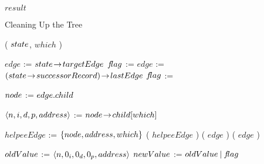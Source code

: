 \begin{limitscope}
\begin{algorithm}[!thb]
{{			
			
	 }
	
	  \BlankLine
		\Return $result$\;
		



}

\caption{Cleaning Up the Tree}
\label{algo:cleanup}
\end{algorithm}





\begin{algorithm}[!thb]
\DefineKeyWords
\DontPrintSemicolon
\Boolean \MarkChildEdge( $state$, $which$ )\;
\PrintSemicolon
\Begin
{

	 {
	    $edge$ := $state \!\rightarrow\! targetEdge$\; 
	    $\flag$ := \DELETEFLAG\;
	 }
	 \Else
	 {
	    $edge$ := $( state \!\rightarrow\! successorRecord ) \!\rightarrow\! lastEdge$\; 
	    $\flag$ := \PROMOTEFLAG\;
	 }
	 
	 
   $node$ := $edge.child$\;
	
   \BlankLine
  
	 \While{\True}
	 {
	    $\langle n, i, d, p, address \rangle$ := $node \!\rightarrow\! child[which]$\;
			
			\uIf{$\iFlag$}
			{
			   $helpeeEdge$ := $\{  node, address, which  \}$\;
				 \HelpTargetNode( $helpeeEdge$ )\;
				 \Continue\;
			}
			\uElseIf{$\dFlag$}
			{
			   \uIf{$\flag$ = \PROMOTEFLAG}
				 {
						\HelpTargetNode( $edge$ )\;
						\Return \False\;
				 } 
				 \lElse
				 {
				    \Return \True
				 }
			}
			\ElseIf{$\pFlag$}
			{
			   \uIf{$\flag$ = \DELETEFLAG}
				 {
						\HelpSuccessorNode( $edge$ )\;
						\Return \False\;
				 } 
				 \lElse
				 {
				    \Return \True
				 }
			}
			
			$oldValue$ := $\langle  n, 0_i, 0_d, 0_p, address  \rangle$\;
			$newValue$ := $oldValue \: | \: f\!lag$\;
			
			
}}
\end{algorithm}
\end{limitscope}

